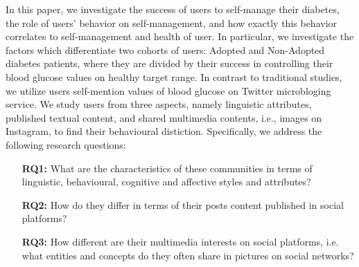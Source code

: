 \documentclass{acm_proc_article-sp}
\begin{document}
In this paper, we investigate the success of users to self-manage their diabetes, the role of users' behavior on self-management, and how exactly this behavior correlates to self-management and health of user.%
In particular, we investigate the factors which differentiate two cohorts of users: Adopted and Non-Adopted diabetes patients, where they are divided by their success in controlling their blood glucose values on healthy target range.
In contrast to traditional studies, we utilize users self-mention values of blood glucose on Twitter microbloging service. We study users from three aspects, namely linguistic attributes, published textual content, and shared multimedia contents, i.e., images on Instagram, to find their behavioural distiction.  Specifically, we address the following research questions:
\begin{itemize}
\item [\textbf{RQ1:}] What are the characteristics of these communities in terms of linguistic, behavioural, cognitive and affective styles and attributes?
\item [\textbf{RQ2:}] How do they differ in terms of their posts content published in social platforms?
\item [\textbf{RQ3:}] How different are their multimedia interests on social platforms, i.e. what entities and concepts do they often share in pictures on social networks?
\end{itemize}
\end{document}
